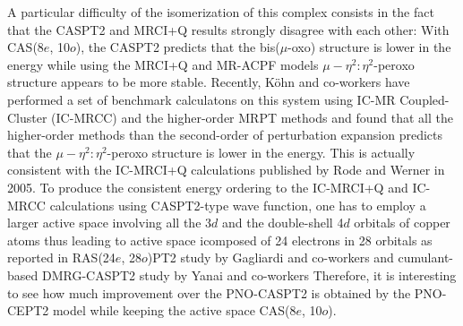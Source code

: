 \documentclass[aip,jcp,amsmath]{revtex4-1}
\begin{document}
%
A particular difficulty of the isomerization of this complex consists in the fact that the CASPT2 and MRCI+Q results strongly disagree with each other: With CAS(8$e$, 10$o$), the CASPT2 predicts that the bis($\mu$-oxo) structure is lower in the energy while using the MRCI+Q and MR-ACPF models $\mu-\eta^2:\eta^2$-peroxo structure appears to be more stable.
%
Recently, K\"ohn and co-workers\cite{AK74} have performed a set of benchmark calculatons on this system using IC-MR Coupled-Cluster (IC-MRCC)\cite{MHandKoehn2011,hanauercommunication:2012} and the higher-order MRPT methods and found that all the higher-order methods than the second-order of perturbation expansion predicts that the $\mu-\eta^2:\eta^2$-peroxo structure is lower in the energy.
%
This is actually consistent with the IC-MRCI+Q calculations published by Rode and Werner in 2005.\cite{Rode2005}
%
To produce the consistent energy ordering to the IC-MRCI+Q and IC-MRCC calculations using CASPT2-type wave function, one has to employ a larger active space involving all the 3$d$ and the double-shell 4$d$ orbitals of copper atoms thus leading to active space icomposed of 24 electrons in 28 orbitals as reported in RAS(24$e$, 28$o$)PT2 study by Gagliardi and co-workers\cite{doi:10.1021/jp056791e} and cumulant-based DMRG-CASPT2 study by Yanai and co-workers\cite{doi:10.1063/1.4900878}
%
Therefore, it is interesting to see how much improvement over the PNO-CASPT2 is obtained by the PNO-CEPT2 model while keeping the active space CAS(8$e$, 10$o$).
\end{document}
